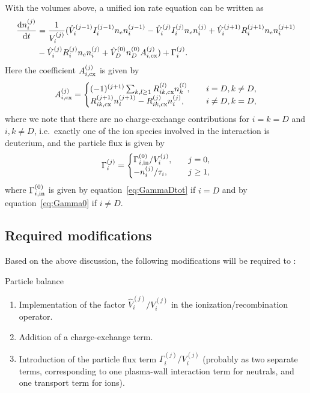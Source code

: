 \documentclass{notes}
\begin{document}
    With the volumes above, a unified ion rate equation can be written as
    \begin{equation}
        \begin{aligned}
            \frac{\mathrm{d} n_i^{(j)}}{\mathrm{d} t} &=
                \frac{1}{V_i^{(j)}}(\hat{V}_i^{(j-1)}
                    I_i^{(j-1)}n_en_i^{(j-1)}
                    -\hat{V}_i^{(j)}I_i^{(j)}n_en_i^{(j)}
                    + \hat{V}_i^{(j+1)}R_i^{(j+1)}n_en_i^{(j+1)} \\
                    &-\hat{V}_i^{(j)}R_i^{(j)}n_en_i^{(j)} 
                	+ \hat{V}_D^{(0)}n_D^{(0)}A_{i,{\rm cx}}^{(j)} ) 
                +\Gamma_i^{(j)}.
        \end{aligned}
    \end{equation}
    Here the coefficient $A_{i,{\rm cx}}^{(j)}$ is given by
    \begin{equation}
    	A_{i,{\rm cx}}^{(j)} = \begin{cases}
    	(-1)^{(j+1)}\sum_{k,l\geq 1}R_{ik,{\rm cx}}^{(l)}n_k^{(l)}, &\quad i=D, k\neq D,\\
    	R_{ik,{\rm cx}}^{(j+1)}n_i^{(j+1)}
                    -R_{ik,{\rm cx}}^{(j)}n_i^{(j)}, &\quad i\neq D, k=D,
    	\end{cases}
    \end{equation}
    where we note that there are no charge-exchange contributions for $i=k=D$ and $i,k\neq D$, i.e.\ exactly one of the ion species involved in the interaction is deuterium, and the particle flux is given by
    \begin{equation}
        \Gamma_i^{(j)} = \begin{cases}
            \Gamma_{i,{\rm in}}^{(0)}/V_i^{(j)}, &\quad j=0,\\
            -n_i^{(j)}/\tau_i, &\quad j\geq 1, 
        \end{cases}
    \end{equation}
    where $\Gamma_{i,{\rm in}}^{(0)}$ is given by equation~\eqref{eq:GammaDtot} if $i=D$ and by equation~\eqref{eq:Gamma0} if $i\neq D$.

    \subsection{Required modifications}
    Based on the above discussion, the following modifications will be required
    to \DREAM:
    \begin{summarybox}{Particle balance}
        \begin{enumerate}
            \item Implementation of the factor $\hat{V}_i^{(j)}/V_i^{(j)}$ in
            the ionization/recombination operator.
            \item Addition of a charge-exchange term.
            \item Introduction of the particle flux term
            $\Gamma_i^{(j)}/V_i^{(j)}$ (probably as two separate terms,
            corresponding to one plasma-wall interaction term for neutrals, and
            one transport term for ions).
        \end{enumerate}
    \end{summarybox}
\end{document}
